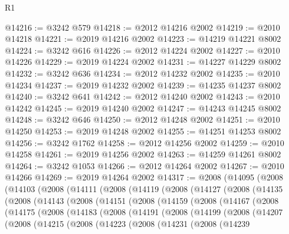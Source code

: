 \begin{lexlean}{R1}
\begin{coremodule}
@14216 := @3242 @579
@14218 := @2012 @14216 @2002
@14219 := @2010 @14218
@14221 := @2019 @14216 @2002
@14223 := @14219 @14221 @8002
@14224 := @3242 @616
@14226 := @2012 @14224 @2002
@14227 := @2010 @14226
@14229 := @2019 @14224 @2002
@14231 := @14227 @14229 @8002
@14232 := @3242 @636
@14234 := @2012 @14232 @2002
@14235 := @2010 @14234
@14237 := @2019 @14232 @2002
@14239 := @14235 @14237 @8002
@14240 := @3242 @641
@14242 := @2012 @14240 @2002
@14243 := @2010 @14242
@14245 := @2019 @14240 @2002
@14247 := @14243 @14245 @8002
@14248 := @3242 @646
@14250 := @2012 @14248 @2002
@14251 := @2010 @14250
@14253 := @2019 @14248 @2002
@14255 := @14251 @14253 @8002
@14256 := @3242 @1762
@14258 := @2012 @14256 @2002
@14259 := @2010 @14258
@14261 := @2019 @14256 @2002
@14263 := @14259 @14261 @8002
@14264 := @3242 @1053
@14266 := @2012 @14264 @2002
@14267 := @2010 @14266
@14269 := @2019 @14264 @2002
@14317 := @2008
    (@14095
      (@2008
        (@14103
          (@2008
            (@14111
              (@2008
                (@14119
                  (@2008
                    (@14127
                      (@2008
                        (@14135
                          (@2008
                            (@14143
                              (@2008
                                (@14151
                                  (@2008
                                    (@14159
                                      (@2008
                                        (@14167
                                          (@2008
                                            (@14175
                                              (@2008
                                                (@14183
                                                  (@2008
                                                    (@14191
                                                      (@2008
                                                        (@14199
                                                          (@2008
                                                            (@14207
                                                              (@2008
                                                                (@14215
                                                                  (@2008
                                                                    (@14223
                                                                      (@2008
                                                                        (@14231
                                                                          (@2008
                                                                            (@14239

\end{coremodule}
\end{lexlean}
